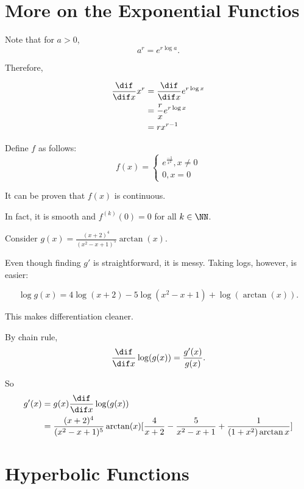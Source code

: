 \documentclass[11pt]{scrartcl}
\begin{document}
\section{More on the Exponential Functios}

Note that for $a>0$,
\begin{equation*}
  a^{r} = e^{r\log a}.
\end{equation*}

Therefore,

\begin{align}
  \frac{\dif }{\dif x}x^{r} & = \frac{\dif }{\dif x}e^{r\log x} \\
                            & = \frac{r}{x} e^{r\log x}         \\
                            & =rx^{r-1}
\end{align}

Define $f$ as follows:
\begin{equation*}
  f(x) = \begin{cases}
    e^{\frac{-1}{x^2}}, x\neq 0\\
    0, x = 0
  \end{cases}
\end{equation*}

It can be proven that $f(x)$ is continuous.

In fact, it is smooth and $f^{(k)}(0) = 0$ for all $k\in \NN$.

Consider $g(x) = \frac{(x+2)^4}{(x^2-x+1)^5}\arctan(x)$.

Even though finding $g'$ is straightforward, it is messy. Taking logs, however, is easier:

\begin{equation*}
\log g(x) = 4 \log(x+2) - 5 \log(x^2-x+1) + \log(\arctan(x)).
\end{equation*}

This makes differentiation cleaner.

By chain rule,
\begin{equation*}
  \frac{\dif }{\dif x}\log(g(x)) = \frac{g'(x)}{g(x)}.
\end{equation*}

So
\begin{align}
  g'(x) & = g(x) \frac{\dif}{\dif x}\log(g(x)) \\
        & = \frac{(x+2)^4}{(x^2-x+1)^5}\arctan(x)[\frac{4}{x+2}-\frac{5}{x^2-x +1}+\frac{1}{(1+x^2)\arctan x}]
\end{align}

\section{Hyperbolic Functions}
\end{document}
